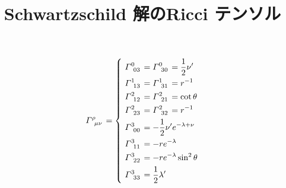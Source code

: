 \documentclass{jsarticle}
\title{Schwartzschild 解のRicci テンソル}
\author{}
\begin{document}
    \maketitle


\begin{equation}
   \tensor{\varGamma}{^\rho_{\mu\nu}} = 
    \left\{  \
        \begin{aligned}
            &\tensor{\varGamma}{^0_{03}} = \tensor{\varGamma}{^0_{30}} = \frac{1}{2} \nu'\\
            &\tensor{\varGamma}{^1_{13}} = \tensor{\varGamma}{^1_{31}} = r^{-1}\\
            &\tensor{\varGamma}{^2_{12}} = \tensor{\varGamma}{^2_{21}} = \cot\theta\\
            &\tensor{\varGamma}{^2_{23}} = \tensor{\varGamma}{^2_{32}} = r^{-1}\\
            &\tensor{\varGamma}{^3_{00}} = -\frac{1}{2} \nu'e^{-\lambda + \nu}\\ 
            &\tensor{\varGamma}{^3_{11}} = -re^{-\lambda}\\
            &\tensor{\varGamma}{^3_{22}} = -re^{-\lambda}\sin^2\theta\\
            &\tensor{\varGamma}{^3_{33}} = \frac{1}{2} \lambda'
        \end{aligned}
    \right. 
\end{equation}
\end{document}
